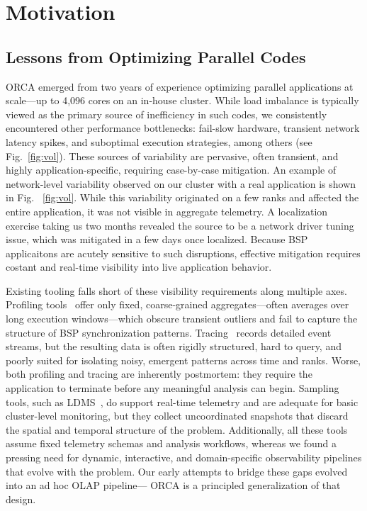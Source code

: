 \documentclass[ letterpaper, DIV=11, numbers=noendperiod]{scrartcl}
\begin{document}
\section{Motivation}
\subsection{Lessons from Optimizing Parallel Codes}

ORCA emerged from two years of experience optimizing parallel applications at
scale---up to 4,096 cores on an in-house cluster. While load imbalance is
typically viewed as the primary source of inefficiency in such codes, we
consistently encountered other performance bottlenecks: fail-slow hardware,
transient network latency spikes, and suboptimal execution strategies, among
others (see Fig.~\ref{fig:vol}). These sources of variability are pervasive,
often transient, and highly application-specific, requiring case-by-case
mitigation. An example of network-level variability observed on our cluster with a real application is shown in Fig. ~\ref{fig:vol}. While this variability originated on a few ranks and affected the entire application, it was not visible in aggregate telemetry. A localization exercise taking us two months revealed the source to be a network driver tuning issue, which was mitigated in a few days once localized. Because BSP applicaitons are acutely sensitive to such disruptions, effective mitigation requires costant and real-time visibility into live application behavior.

Existing tooling falls short of these visibility requirements along multiple
axes. Profiling tools~\cite{Shend2006:TAU} offer only fixed, coarse-grained aggregates---often
averages over long execution windows---which obscure transient outliers and
fail to capture the structure of BSP synchronization patterns. Tracing~\cite{Shend2006:TAU,Wylie2025:15Years}
records detailed event streams, but the resulting data is often rigidly
structured, hard to query, and poorly suited for isolating noisy, emergent
patterns across time and ranks. Worse, both profiling and tracing are
inherently postmortem: they require the application to terminate before any
meaningful analysis can begin. Sampling tools, such as LDMS~\cite{Schwa2021:LDMS}, do support
real-time telemetry and are adequate for basic cluster-level monitoring, but
they collect uncoordinated snapshots that discard the spatial and temporal
structure of the problem. Additionally, all these tools assume fixed telemetry
schemas and analysis workflows, whereas we found a pressing need for dynamic,
interactive, and domain-specific observability pipelines that evolve with the
problem. Our early attempts to bridge these gaps evolved into an ad hoc OLAP pipeline---
ORCA is a principled generalization of that design.
\end{document}
